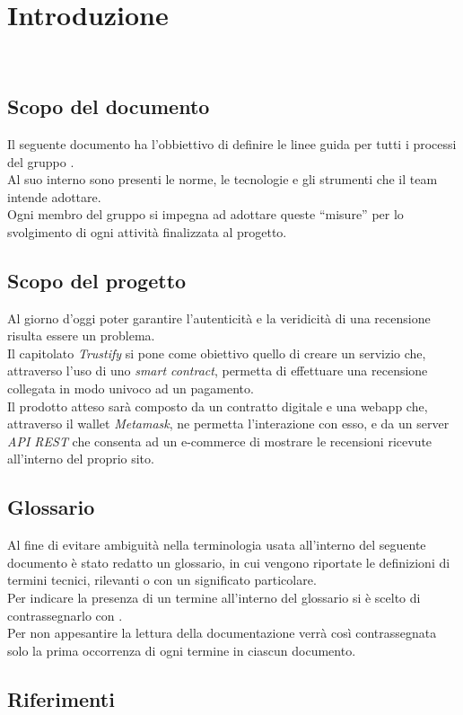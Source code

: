 \section{Introduzione}\
\subsection{Scopo del documento}
Il seguente documento ha l'obbiettivo di definire le linee guida per tutti i
processi del gruppo \groupName. \\ Al suo interno sono presenti le norme, le
tecnologie e gli strumenti che il team intende adottare. \\ Ogni membro del
gruppo si impegna ad adottare queste “misure” per lo svolgimento di ogni
attività finalizzata al progetto.

\subsection{Scopo del progetto}
Al giorno d'oggi poter garantire l'autenticità e la veridicità di una
recensione risulta essere un problema. \\ Il capitolato \textit{Trustify} si
pone come obiettivo quello di creare un servizio che, attraverso l'uso di uno
\textit{smart contract}, permetta di effettuare una recensione collegata in
modo univoco ad un pagamento. \\ Il prodotto atteso sarà composto da un
contratto digitale e una webapp che, attraverso il wallet \textit{Metamask}, ne
permetta l'interazione con esso, e da un server \textit{API REST} che consenta ad un
e-commerce di mostrare le recensioni ricevute all'interno del proprio sito.

\subsection{Glossario}
Al fine di evitare ambiguità nella terminologia usata all'interno del seguente
documento è stato redatto un glossario, in cui vengono riportate le definizioni
di termini tecnici, rilevanti o con un significato particolare. \\ Per indicare
la presenza di un termine all'interno del glossario si è scelto di
contrassegnarlo con \glo.\\ Per non appesantire la lettura della documentazione
verrà così contrassegnata solo la prima occorrenza di ogni termine in ciascun
documento.

\subsection{Riferimenti}
